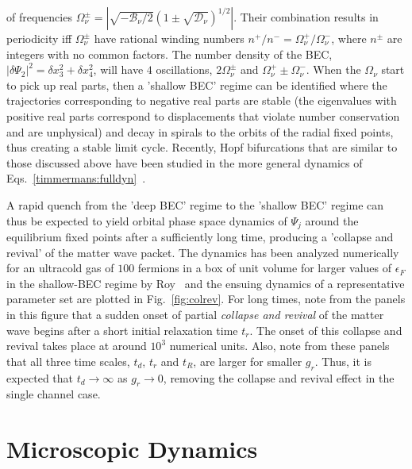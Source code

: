 \documentclass[aps,pra,floats,epsfig,pdflatex]{revtex4}                                                              %
\begin{document}
of frequencies $\Omega^{\pm}_\nu=|\sqrt{-{\mathcal{B}_\nu}/{2}}(1\pm\sqrt{\mathcal{D}_\nu})^{1/2}|$. Their combination results in periodicity iff $\Omega^\pm_\nu$ have rational winding numbers $n^+/n^- = \Omega^+_\nu/\Omega^-_\nu$, where $n^\pm$ are integers with no common factors. The number density of the BEC, $|\delta \Psi_2|^2=\delta x^2_3 + \delta x^2_4$, will have $4$ oscillations, $2\Omega^\pm_\nu$ and $\Omega^+_\nu\pm\Omega^-_\nu$. When the $\Omega_\nu$ start to pick up real parts, then a 'shallow BEC' regime can be identified where the trajectories corresponding to negative real parts are stable (the eigenvalues with positive real parts correspond to displacements that violate number conservation and are unphysical) and decay in spirals to the orbits of the radial fixed points, thus creating a stable limit cycle. Recently, Hopf bifurcations that are similar to those discussed above have been studied in the more general dynamics of Eqs.~\ref{timmermans:fulldyn}~\cite{hopf}.

A rapid quench from the 'deep BEC' regime to the 'shallow BEC' regime can thus be expected to yield orbital phase space dynamics of $\Psi_j$ around the equilibrium fixed points after a sufficiently long time, producing a 'collapse and revival' of the matter wave packet. The dynamics has been analyzed numerically for an ultracold gas of $100$ fermions in a box of unit volume for larger values of $\epsilon_F$ in the shallow-BEC regime by Roy~\cite{mypaper4} and the ensuing dynamics of a representative parameter set are plotted in Fig.~\ref{fig:colrev}. For long times, note from the panels in this figure that a sudden onset of partial \textit{collapse and revival} of the matter wave begins after a short initial relaxation time $t_r$. The onset of this collapse and revival takes place at around $10^3$ numerical units. Also, note from these panels that all three time scales, $t_d$, $t_r$ and $t_R$, are larger for smaller $g_r$. Thus, it is expected that $t_d \rightarrow \infty$ as $g_r \rightarrow 0$, removing 
the collapse and revival effect in the single channel case. 
\section{Microscopic Dynamics }
\label{sec:fermidyn}
\end{document}
